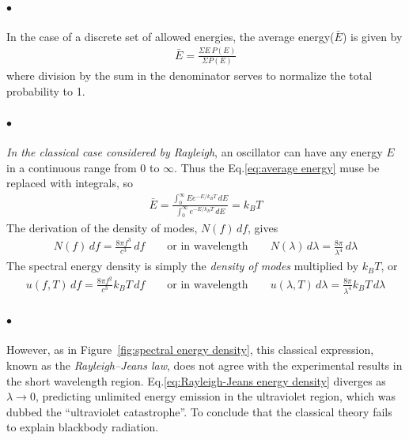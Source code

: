 \documentclass[a4paper]{report}
\begin{document}
            \paragraph{\color{c3}$\bullet$} In the case of a discrete set of allowed energies, the average energy($\bar{E}$) is given by
            \begin{align}
                \label{eq:average energy}
                \bar{E} = \frac{\Sigma E\, P(E)}{\Sigma P(E)}
            \end{align}
            where division by the sum in the denominator serves to normalize the total probability to 1.

            \paragraph{\color{c3}$\bullet$} \textit{In the classical case considered by Rayleigh}, an oscillator can have any energy $E$ in
            a continuous range from 0 to $\infty$. Thus the Eq.\eqref{eq:average energy} muse be replaced with integrals, so 
            \begin{align}
                \label{eq:average energy integral}
                \bar{E} = \frac{\int_0^\infty Ee^{-E/k_B T}\, dE}{\int_0^\infty e^{-E/k_B T}\, dE} = k_B T
            \end{align}
            The derivation of the density of modes, $N( f )\, df$, gives
            \begin{align}
                \label{eq:density of modes}
                N(f)\, df = \frac{8 \pi f^3}{c^3} \, df \qquad \text{or in wavelength} \qquad 
                N(\lambda) \, d\lambda = \frac{8 \pi }{\lambda^4}\, d\lambda  
            \end{align}
            The spectral energy density is simply the \textit{density of modes} multiplied by $k_B T$, or
            \begin{align}
                \label{eq:Rayleigh-Jeans energy density}
                u(f, T)\, df = \frac{8 \pi f^2}{c^3} k_B T\, df \qquad \text{or in wavelength} \qquad 
                u(\lambda, T)\, d\lambda = \frac{8 \pi}{\lambda^4} k_B T\, d\lambda
            \end{align}
            
            \paragraph{\color{c3}$\bullet$} However, as in Figure~\ref{fig:spectral energy density}, this classical expression, 
            known as the \textit{Rayleigh–Jeans law}, does not agree with the experimental results in the short wavelength region.
            Eq.\eqref{eq:Rayleigh-Jeans energy density} diverges as $\lambda \to 0$, predicting unlimited energy emission in the 
            ultraviolet region, which was dubbed the “ultraviolet catastrophe”. To conclude that the classical theory fails 
            to explain blackbody radiation.
\end{document}
